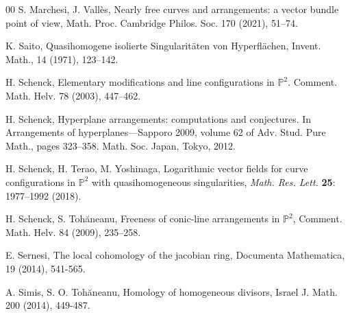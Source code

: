 \documentclass[12pt]{amsart}
\theoremstyle{plain}
\theoremstyle{definition}
\numberwithin{equation}{section}
\newcommand{\PP}{\mathbb{P}}
\begin{document}
\begin{thebibliography}{00}
  S. Marchesi, J. Vall\` es, Nearly free curves and arrangements: a vector bundle point of view, Math. Proc. Cambridge Philos. Soc. 170 (2021), 51--74.
 
  
  
  
  
 
  K. Saito, Quasihomogene isolierte Singularit\"aten von Hyperfl\"achen, Invent. Math., 14 (1971), 123--142.




 H. Schenck, Elementary modifications and line configurations in $\PP^2$. Comment. Math.
Helv. 78 (2003), 447--462. 

 H. Schenck, Hyperplane arrangements: computations and conjectures. In Arrangements of
hyperplanes—Sapporo 2009, volume 62 of Adv. Stud. Pure Math., pages 323--358. Math. Soc.
Japan, Tokyo, 2012.


 H. Schenck, H. Terao, M. Yoshinaga,
Logarithmic vector fields for curve configurations in $\PP^2$ with quasihomogeneous singularities,
\textit{Math. Res. Lett.}
\textbf{25}: 1977--1992 (2018).


 H. Schenck, S. Toh\u aneanu, Freeness of conic-line arrangements in $\PP^2$, Comment. Math. Helv. 84 (2009), 235--258.


 E. Sernesi,  The local cohomology of the jacobian ring, {Documenta Mathematica},  19 (2014), 541-565. 






 A. Simis, S. O. Toh\u aneanu, Homology of homogeneous divisors, Israel J. Math. 200 (2014), 449-487.



\end{thebibliography}
\end{document}
